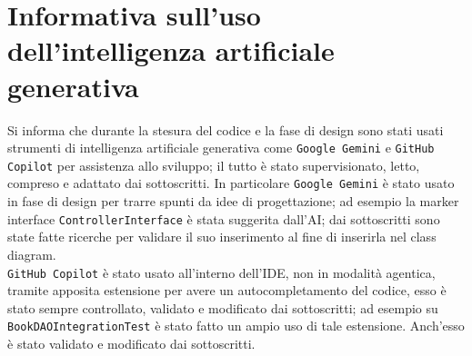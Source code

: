 \section*{Informativa sull'uso dell'intelligenza artificiale generativa}
Si informa che durante la stesura del codice e la fase di design sono stati usati strumenti di intelligenza artificiale generativa come \texttt{Google Gemini} e \texttt{GitHub Copilot} per assistenza allo sviluppo; il tutto è stato supervisionato, letto, compreso e adattato dai sottoscritti.
In particolare \texttt{Google Gemini} è stato usato in fase di design per trarre spunti da idee di progettazione; ad esempio la marker interface \texttt{ControllerInterface} è stata suggerita dall'AI; dai sottoscritti sono state fatte ricerche per validare il suo inserimento al fine di inserirla nel class diagram. \\
\texttt{GitHub Copilot} è stato usato all'interno dell'IDE, non in modalità agentica, tramite apposita estensione per avere un autocompletamento del codice, esso è stato sempre controllato, validato e modificato dai sottoscritti; ad esempio su \texttt{BookDAOIntegrationTest} è stato fatto un ampio uso di tale estensione. Anch'esso è stato validato e modificato dai sottoscritti.